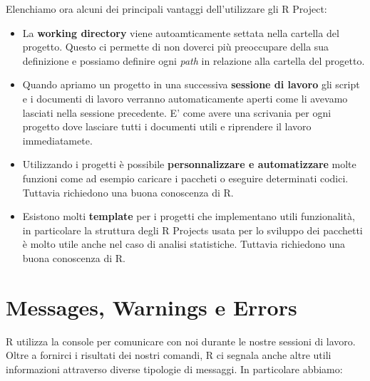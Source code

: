 \documentclass[
]{book}
\providecommand{\tightlist}{%
  \setlength{\itemsep}{0pt}\setlength{\parskip}{0pt}}
\begin{document}
Elenchiamo ora alcuni dei principali vantaggi dell'utilizzare gli R Project:

\begin{itemize}
\tightlist
\item
  La \textbf{working directory} viene autoamticamente settata nella cartella del progetto. Questo ci permette di non doverci più preoccupare della sua definizione e possiamo definire ogni \emph{path} in relazione alla cartella del progetto.
\item
  Quando apriamo un progetto in una successiva \textbf{sessione di lavoro} gli script e i documenti di lavoro verranno automaticamente aperti come li avevamo lasciati nella sessione precedente. E' come avere una scrivania per ogni progetto dove lasciare tutti i documenti utili e riprendere il lavoro immediatamete.
\item
  Utilizzando i progetti è possibile \textbf{personnalizzare e automatizzare} molte funzioni come ad esempio caricare i paccheti o eseguire determinati codici. Tuttavia richiedono una buona conoscenza di R.
\item
  Esistono molti \textbf{template} per i progetti che implementano utili funzionalità, in particolare la struttura degli R Projects usata per lo sviluppo dei pacchetti è molto utile anche nel caso di analisi statistiche. Tuttavia richiedono una buona conoscenza di R.
\end{itemize}

\hypertarget{messages-warnings-e-errors}{%
\section{Messages, Warnings e Errors}\label{messages-warnings-e-errors}}

R utilizza la console per comunicare con noi durante le nostre sessioni di lavoro. Oltre a fornirci i risultati dei nostri comandi, R ci segnala anche altre utili informazioni attraverso diverse tipologie di messaggi. In particolare abbiamo:
\end{document}
